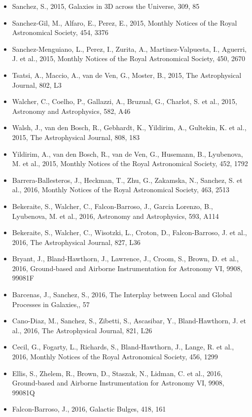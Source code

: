 \documentclass{letter}
\begin{document}
\begin{enumerate}
\begin{itemize}
\item Sanchez, S., 2015, Galaxies in 3D across the Universe, 309, 85
\item Sanchez-Gil, M., Alfaro, E., Perez, E., 2015, Monthly Notices of the Royal Astronomical Society, 454, 3376
\item Sanchez-Menguiano, L., Perez, I., Zurita, A., Martinez-Valpuesta, I., Aguerri, J. et al., 2015, Monthly Notices of the Royal Astronomical Society, 450, 2670
\item Tsatsi, A., Maccio, A., van de Ven, G., Moster, B., 2015, The Astrophysical Journal, 802, L3
\item Walcher, C., Coelho, P., Gallazzi, A., Bruzual, G., Charlot, S. et al., 2015, Astronomy and Astrophysics, 582, A46
\item Walsh, J., van den Bosch, R., Gebhardt, K., Yildirim, A., Gultekin, K. et al., 2015, The Astrophysical Journal, 808, 183
\item Yildirim, A., van den Bosch, R., van de Ven, G., Husemann, B., Lyubenova, M. et al., 2015, Monthly Notices of the Royal Astronomical Society, 452, 1792
\item Barrera-Ballesteros, J., Heckman, T., Zhu, G., Zakamska, N., Sanchez, S. et al., 2016, Monthly Notices of the Royal Astronomical Society, 463, 2513
\item Bekeraite, S., Walcher, C., Falcon-Barroso, J., Garcia Lorenzo, B., Lyubenova, M. et al., 2016, Astronomy and Astrophysics, 593, A114
\item Bekeraite, S., Walcher, C., Wisotzki, L., Croton, D., Falcon-Barroso, J. et al., 2016, The Astrophysical Journal, 827, L36
\item Bryant, J., Bland-Hawthorn, J., Lawrence, J., Croom, S., Brown, D. et al., 2016, Ground-based and Airborne Instrumentation for Astronomy VI, 9908, 99081F
\item Barcenas, J., Sanchez, S., 2016, The Interplay between Local and Global Processes in Galaxies,, 57
\item Cano-Diaz, M., Sanchez, S., Zibetti, S., Ascasibar, Y., Bland-Hawthorn, J. et al., 2016, The Astrophysical Journal, 821, L26
\item Cecil, G., Fogarty, L., Richards, S., Bland-Hawthorn, J., Lange, R. et al., 2016, Monthly Notices of the Royal Astronomical Society, 456, 1299
\item Ellis, S., Zhelem, R., Brown, D., Staszak, N., Lidman, C. et al., 2016, Ground-based and Airborne Instrumentation for Astronomy VI, 9908, 99081Q
\item Falcon-Barroso, J., 2016, Galactic Bulges, 418, 161

\end{itemize}
\end{enumerate}
\end{document}
